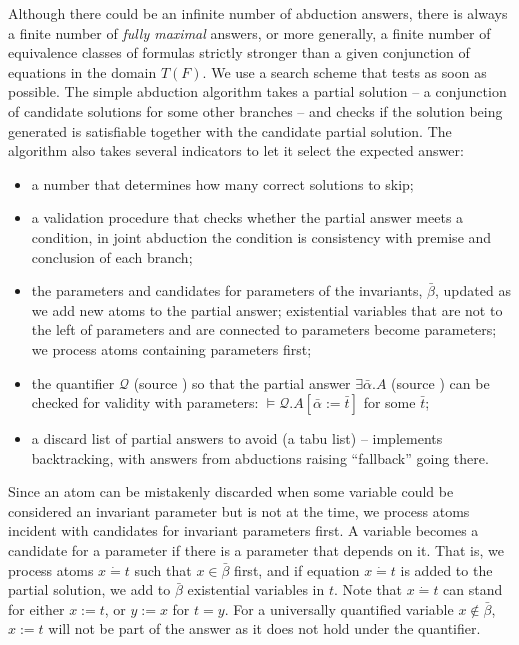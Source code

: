 \documentclass{article}
\newcommand{\assign}{:=}
\newcommand{\nin}{\not\in}
\newcommand{\tmem}[1]{{\em #1\/}}
\newcommand{\tmverbatim}[1]{{\ttfamily{#1}}}
\begin{document}
Although there could be an infinite number of abduction answers, there is
always a finite number of {\tmem{fully maximal}} answers, or more generally, a
finite number of equivalence classes of formulas strictly stronger than a
given conjunction of equations in the domain $T (F)$. We use a search scheme
that tests as soon as possible. The simple abduction algorithm takes a partial
solution -- a conjunction of candidate solutions for some other branches --
and checks if the solution being generated is satisfiable together with the
candidate partial solution. The algorithm also takes several indicators to let
it select the expected answer:
\begin{itemize}
  \item a number that determines how many correct solutions to skip;
  
  \item a validation procedure that checks whether the partial answer meets a
  condition, in joint abduction the condition is consistency with premise and
  conclusion of each branch;
  
  \item the parameters and candidates for parameters of the invariants,
  $\bar{\beta}$, updated as we add new atoms to the partial answer;
  existential variables that are not to the left of parameters and are
  connected to parameters become parameters; we process atoms containing
  parameters first;
  
  \item the quantifier $\mathcal{Q}$ (source \tmverbatim{q}) so that the
  partial answer $\exists \bar{\alpha} .A$ (source \tmverbatim{vs,ans}) can be
  checked for validity with parameters: $\vDash \mathcal{Q}.A [\bar{\alpha}
  \assign \bar{t}]$ for some $\bar{t}$;
  
  \item a discard list of partial answers to avoid (a tabu list) -- implements
  backtracking, with answers from abductions raising ``fallback'' going there.
\end{itemize}
Since an atom can be mistakenly discarded when some variable could be
considered an invariant parameter but is not at the time, we process atoms
incident with candidates for invariant parameters first. A variable becomes a
candidate for a parameter if there is a parameter that depends on it. That is,
we process atoms $x \dot{=} t$ such that $x \in \bar{\beta}$ first, and if
equation $x \dot{=} t$ is added to the partial solution, we add to
$\bar{\beta}$ existential variables in $t$. Note that $x \dot{=} t$ can stand
for either $x \assign t$, or $y \assign x$ for $t = y$. For a universally
quantified variable $x \nin \bar{\beta}$, $x \assign t$ will not be part of
the answer as it does not hold under the quantifier.
\end{document}
